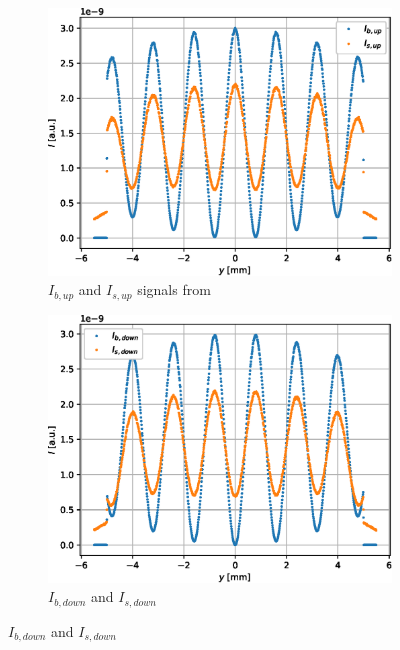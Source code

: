 \begin{figure}[htbp]
	\centering
	\begin{subfigure}[b]{0.45\textwidth}
		\centering
		\includegraphics[width=\textwidth]{simulation-raw-intensity-up}
		\caption{$I_{b,up}$ and $I_{s,up}$ signals from }
		\label{fig:simulation-raw-intensity-up}
	\end{subfigure}
	\hfill
	\begin{subfigure}[b]{0.45\textwidth}
		\centering
		\includegraphics[width=\textwidth]{simulation-raw-intensity-down}
		\caption{$I_{b,down}$ and $I_{s,down}$}
		\label{fig:simulation-raw-intensity-down}
	\end{subfigure}

\end{figure}
